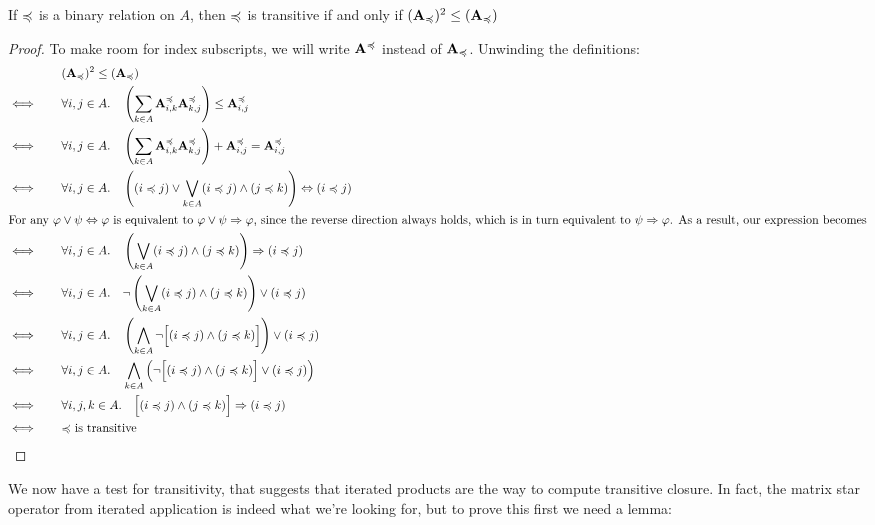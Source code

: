 \documentclass{article}
\begin{document}
	\begin{prop}
		If $\preccurlyeq$ is a binary relation on $A$, then $\preccurlyeq$ is transitive if and only if $(\mathbf A_{\preccurlyeq})^2 \leq (\mathbf A_\preccurlyeq)$
	\end{prop}
	\begin{proof} 
	To make room for index subscripts, we will write $\mathbf A^\preccurlyeq$ instead of $\mathbf A_\preccurlyeq$. Unwinding the definitions:	
	\begin{align*}
		&(\mathbf A_\preccurlyeq)^2 \leq (\mathbf A_\preccurlyeq)  \\
		\iff\qquad&\forall i,j \in A.\quad  \left(\sum_{k \in A} \mathbf A^\preccurlyeq_{i,k} \mathbf A^\preccurlyeq_{k,j}\right) \leq \mathbf A^\preccurlyeq_{i,j}   \\
		\iff\qquad &\forall i,j \in A.\quad  \left(\sum_{k \in A} \mathbf A^\preccurlyeq_{i,k} \mathbf A^\preccurlyeq_{k,j}\right)+ \mathbf A^\preccurlyeq_{i,j}  = \mathbf A^\preccurlyeq_{i,j}\\
		\iff\qquad &\forall i,j \in A.\quad \left( (i\preccurlyeq j) \lor \bigvee_{k \in A} (i \preccurlyeq j) \land (j \preccurlyeq k) \right) \Leftrightarrow (i \preccurlyeq j)\\
	\intertext{For any  $\varphi \lor \psi \Leftrightarrow \varphi$ is equivalent to $\varphi \lor \psi \Rightarrow \varphi$, since the reverse direction always holds, which is in turn equivalent to $\psi \Rightarrow \varphi$. As a result, our expression becomes}
		\iff\qquad &\forall i,j \in A.\quad  \left(\bigvee_{k \in A} (i \preccurlyeq j) \land (j \preccurlyeq k) \right) \Rightarrow (i \preccurlyeq j) \\
		\iff\qquad &\forall i,j \in A.\quad  \lnot \left(\bigvee_{k \in A} (i \preccurlyeq j) \land (j \preccurlyeq k) \right) \lor (i \preccurlyeq j) \\
		\iff\qquad &\forall i,j \in A.\quad  \left(\bigwedge_{k \in A} \lnot\Big[ (i \preccurlyeq j) \land (j \preccurlyeq k) \Big] \right) \lor (i \preccurlyeq j) \\
		\iff\qquad &\forall i,j \in A.\quad  \bigwedge_{k \in A}\left( \lnot\Big[ (i \preccurlyeq j) \land (j \preccurlyeq k) \Big]  \lor (i \preccurlyeq j) \right) \\
		\iff\qquad &\forall i,j,k \in A.\quad   \Big[ (i \preccurlyeq j) \land (j \preccurlyeq k) \Big]  \Rightarrow (i \preccurlyeq j) \\
		\iff\qquad & \text{$\preccurlyeq$ is transitive}
	\end{align*}
	\end{proof}

	We now have a test for transitivity, that suggests that iterated products are the way to compute transitive closure. In fact, the matrix star operator from iterated application is indeed what we're looking for, but to prove this first we need a lemma:
	
\end{document}
